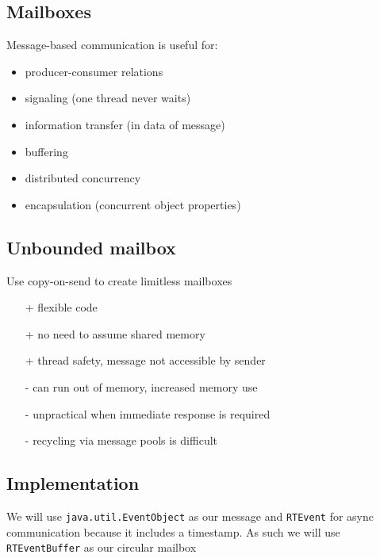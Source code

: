 \documentclass[]{article}
\theoremstyle{definition}
\begin{document}
	\subsection{Mailboxes}
	Message-based communication is useful for:
	\begin{itemize}
		\item producer-consumer relations
		\item signaling (one thread never waits)
		\item information transfer (in data of message)
		\item buffering
		\item distributed concurrency
		\item encapsulation (concurrent object properties)
	\end{itemize}

	\subsection{Unbounded mailbox}
	Use copy-on-send to create limitless mailboxes
	\begin{itemize}
		\item[+] flexible code
		\item[+] no need to assume shared memory
		\item[+] thread safety, message not accessible by sender
		\item[-] can run out of memory, increased memory use
		\item[-] unpractical when immediate response is required
		\item[-] recycling via message pools is difficult
	\end{itemize}

	\subsection{Implementation}
	We will use \lstinline|java.util.EventObject| as our message and \lstinline|RTEvent| for async communication because it includes a timestamp. As such we will use \lstinline|RTEventBuffer| as our circular mailbox
\end{document}
